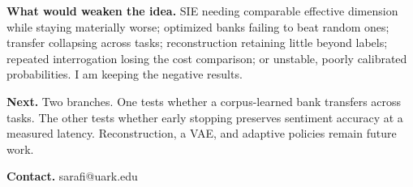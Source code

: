 \textbf{What would weaken the idea.} SIE needing comparable effective dimension while staying materially worse; optimized banks failing to beat random ones; transfer collapsing across tasks; reconstruction retaining little beyond labels; repeated interrogation losing the cost comparison; or unstable, poorly calibrated probabilities. I am keeping the negative results.

\textbf{Next.} Two branches. One tests whether a corpus-learned bank transfers across tasks. The other tests whether early stopping preserves sentiment accuracy at a measured latency. Reconstruction, a VAE, and adaptive policies remain future work.

\textbf{Contact.} sarafi@uark.edu

